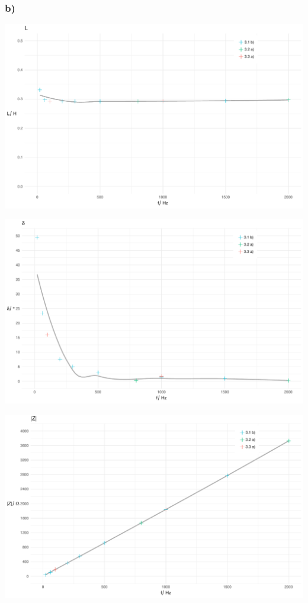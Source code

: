 \documentclass[a4paper, 12pt]{article}
\begin{document}
      \subsubsection*{b)}
      \begin{center}
        \includegraphics[scale=0.5]{./R/3_3/3_3_Induktivitaet.pdf}
      \end{center}
      \vspace{0.021276873\paperheight}
      \begin{center}
        \includegraphics[scale=0.5]{./R/3_3/3_3_Verlustwinkel.pdf}
      \end{center}
      \vspace{0.021276873\paperheight}
      \begin{center}
        \includegraphics[scale=0.5]{./R/3_3/3_3_Scheinwiderstand.pdf}
      \end{center}
\end{document}
